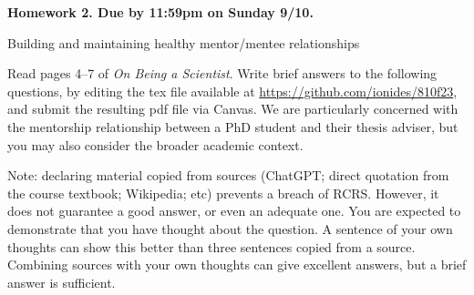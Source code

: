 \documentclass[12pt]{article}
\begin{document}
\begin{center}\bf
Homework 2. Due by 11:59pm on Sunday 9/10.

Building and maintaining healthy mentor/mentee relationships

\end{center}

Read pages 4--7 of {\em On Being a Scientist}. Write brief answers to the following questions, by editing the tex file available at \url{https://github.com/ionides/810f23}, and submit the resulting pdf file via Canvas. We are particularly concerned with the mentorship relationship between a PhD student and their thesis adviser, but you may also consider the broader academic context.

Note: declaring material copied from sources (ChatGPT; direct quotation from the course textbook; Wikipedia; etc) prevents a breach of RCRS. However, it does not guarantee a good answer, or even an adequate one. You are expected to demonstrate that you have thought about the question. A sentence of your own thoughts can show this better than three sentences copied from a source. Combining sources with your own thoughts can give excellent answers, but a brief answer is sufficient.
\end{document}
